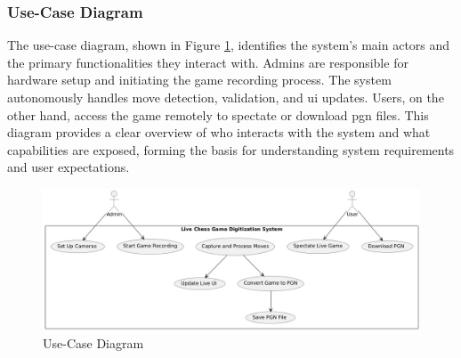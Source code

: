 \subsubsection*{Use-Case Diagram}
\label{subsubsec:use-case-diagram}

The use-case diagram, shown in Figure \ref{fig:use-case}, identifies the system’s main actors and the primary functionalities they interact with. Admins are responsible for hardware setup and initiating the game recording process. The system autonomously handles move detection, validation, and \gls{ui} updates. Users, on the other hand, access the game remotely to spectate or download \gls{pgn} files. This diagram provides a clear overview of who interacts with the system and what capabilities are exposed, forming the basis for understanding system requirements and user expectations.

\begin{figure}[h!]
    \centering
    \includegraphics[width=0.75\linewidth]{figures/methods/uml/use-case.png}
    \caption{Use-Case Diagram}
    \label{fig:use-case}
\end{figure}

